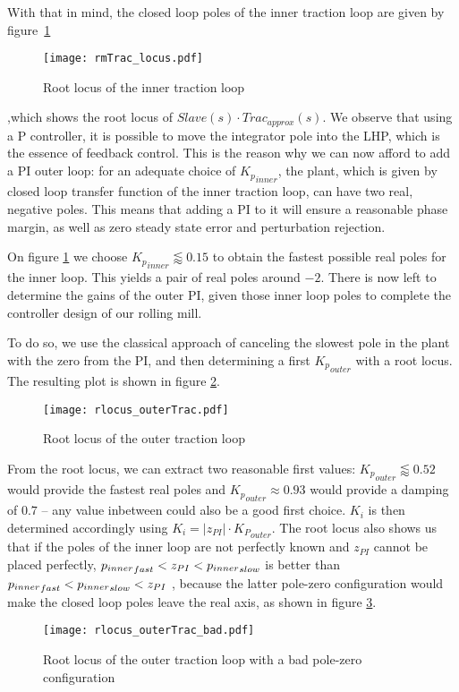 With that in mind, the closed loop poles of the inner traction loop are given by figure~\ref{fig:rmTracLocus}
\begin{figure}[htbp]
  \centering
  \texttt{[image: rmTrac\_locus.pdf]}
  \caption{Root locus of the inner traction loop\label{fig:rmTracLocus}}
\end{figure}
,which shows the root locus of $Slave(s) \cdot Trac_{approx}(s)$. We observe that using a P controller, it is possible to move the integrator pole into the LHP, which is the essence of feedback control. This is the reason why we can now afford to add a PI outer loop: for an adequate choice of ${K_p}_{inner}$, the plant, which is given by closed loop transfer function of the inner traction loop, can have two real, negative poles. This means that adding a PI to it will ensure a reasonable phase margin, as well as zero steady state error and perturbation rejection.

On figure \ref{fig:rmTracLocus} we choose ${K_p}_{inner} \lessapprox 0.15$ to obtain the fastest possible real poles for the inner loop. This yields a pair of real poles around $-2$. There is now left to determine the gains of the outer PI, given those inner loop poles to complete the controller design of our rolling mill.

To do so, we use the classical approach of canceling the slowest pole in the plant with the zero from the PI, and then determining a first ${K_p}_{outer}$ with a root locus. The resulting plot is shown in figure \ref{fig:rlocus_OuterTrac}.
\begin{figure}[htbp]
  \centering
  \texttt{[image: rlocus\_outerTrac.pdf]}
  \caption{Root locus of the outer traction loop\label{fig:rlocus_OuterTrac}}
\end{figure}
From the root locus, we can extract two reasonable first values: ${K_p}_{outer} \lessapprox 0.52$ would provide the fastest real poles and ${K_p}_{outer} \approx 0.93$ would provide a damping of $0.7$ -- any value inbetween could also be a good first choice. $K_i$ is then determined accordingly using $K_i = |z_{PI}| \cdot {K_P}_{outer}$. The root locus also shows us that if the poles of the inner loop are not perfectly known and $z_{PI}$ cannot be placed perfectly, ${p_{inner}}_{fast}<\nobreak z_{PI}<\nobreak{p_{inner}}_{slow}$ is better than ${p_{inner}}_{fast}<\nobreak{p_{inner}}_{slow}<\nobreak z_{PI}$
, because the latter pole-zero configuration would make the closed loop poles leave the real axis, as shown in figure \ref{fig:rlocus_outerTrac_bad}.
\begin{figure}[htbp]
  \centering
  \texttt{[image: rlocus\_outerTrac\_bad.pdf]}
  \caption{Root locus of the outer traction loop with a bad pole-zero configuration\label{fig:rlocus_outerTrac_bad}}
\end{figure}

